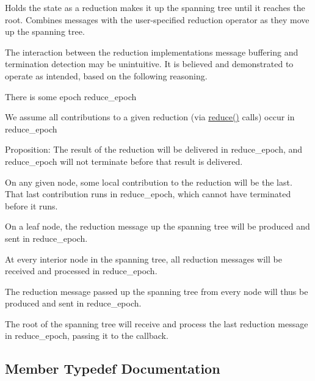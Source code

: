 Holds the state as a reduction makes it up the spanning tree until it reaches the root. Combines messages with the user-\/specified reduction operator as they move up the spanning tree.

The interaction between the reduction implementation\textquotesingle{}s message buffering and termination detection may be unintuitive. It is believed and demonstrated to operate as intended, based on the following reasoning.
\begin{DoxyItemize}
\item There is some epoch {\ttfamily reduce\+\_\+epoch}
\item We assume all contributions to a given reduction (via {\ttfamily \hyperlink{structvt_1_1collective_1_1reduce_1_1_reduce_adf8bd9748a220a3ed29087c30f8adafc}{reduce()}} calls) occur in {\ttfamily reduce\+\_\+epoch}
\item Proposition\+: The result of the reduction will be delivered in {\ttfamily reduce\+\_\+epoch}, and {\ttfamily reduce\+\_\+epoch} will not terminate before that result is delivered.
\item On any given node, some local contribution to the reduction will be the last. That last contribution runs in {\ttfamily reduce\+\_\+epoch}, which cannot have terminated before it runs.
\item On a leaf node, the reduction message up the spanning tree will be produced and sent in {\ttfamily reduce\+\_\+epoch}.
\item At every interior node in the spanning tree, all reduction messages will be received and processed in {\ttfamily reduce\+\_\+epoch}.
\item The reduction message passed up the spanning tree from every node will thus be produced and sent in {\ttfamily reduce\+\_\+epoch}.
\item The root of the spanning tree will receive and process the last reduction message in {\ttfamily reduce\+\_\+epoch}, passing it to the callback. 
\end{DoxyItemize}

\subsection{Member Typedef Documentation}
\mbox{\label{structvt_1_1collective_1_1reduce_1_1_reduce_a0474b491f3c93014d9a0ce0356c6bfd5}} 
